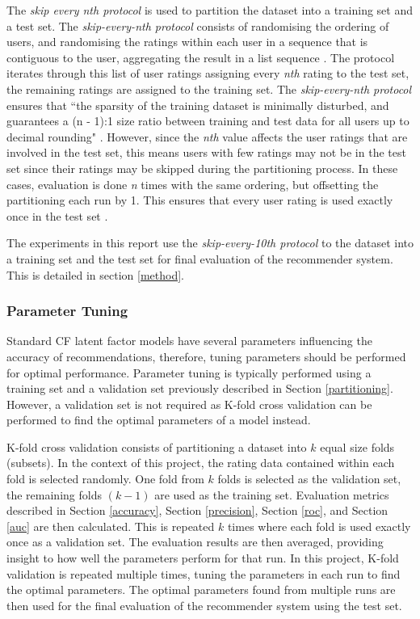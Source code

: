 The \textit{skip every nth protocol} \cite{zhang} is used to partition the dataset into a training set and a test set. The \textit{skip-every-nth protocol} consists of randomising the ordering of users, and randomising the ratings within each user in a sequence that is contiguous to the user, aggregating the result in a list sequence \cite{zhang}. The protocol iterates through this list of user ratings assigning every \textit{nth} rating to the test set, the remaining ratings are assigned to the training set. The \textit{skip-every-nth protocol} ensures that ``the sparsity of the training dataset is minimally disturbed, and guarantees a (n - 1):1 size ratio between training and test data for all users up to decimal rounding" \cite{zhang}. However, since the \textit{nth} value affects the user ratings that are involved in the test set, this means users with few ratings may not be in the test set since their ratings may be skipped during the partitioning process. In these cases, evaluation is done \textit{n} times with the same ordering, but offsetting the partitioning each run by 1. This ensures that every user rating is used exactly once in the test set \cite{zhang}. 

The experiments in this report use the \textit{skip-every-10th protocol} to the dataset into a training set and the test set for final evaluation of the recommender system. This is detailed in section \ref{method}.

\subsubsection{Parameter Tuning}

Standard CF latent factor models have several parameters influencing the accuracy of recommendations, therefore, tuning parameters should be performed for optimal performance. Parameter tuning is typically performed using a training set and a validation set previously described in Section \ref{partitioning}. However, a validation set is not required as K-fold cross validation can be performed to find the optimal parameters of a model instead. 

K-fold cross validation \cite{kfold, campochiaro2009metrics} consists of partitioning a dataset into $k$ equal size folds (subsets). In the context of this project, the rating data contained within each fold is selected randomly. One fold from $k$ folds is selected as the validation set, the remaining folds $(k-1)$ are used as the training set. Evaluation metrics described in Section \ref{accuracy}, Section \ref{precision}, Section \ref{roc}, and Section \ref{auc} are then calculated. This is repeated $k$ times where each fold is used exactly once as a validation set. The evaluation results are then averaged, providing insight to how well the parameters perform for that run. In this project, K-fold validation is repeated multiple times, tuning the parameters in each run to find the optimal parameters. The optimal parameters found from multiple runs are then used for the final evaluation of the recommender system using the test set.

